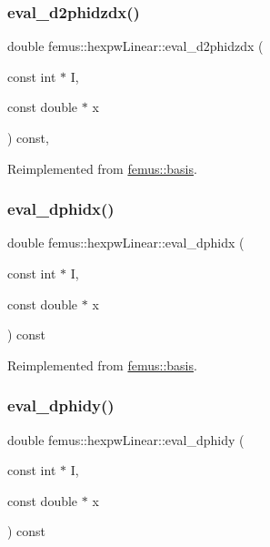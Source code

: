 \subsubsection{\texorpdfstring{eval\+\_\+d2phidzdx()}{eval\_d2phidzdx()}}
{\footnotesize\ttfamily double femus\+::hexpw\+Linear\+::eval\+\_\+d2phidzdx (\begin{DoxyParamCaption}\item[{const int $\ast$}]{I,  }\item[{const double $\ast$}]{x }\end{DoxyParamCaption}) const\hspace{0.3cm}{\ttfamily [inline]}, {\ttfamily [virtual]}}



Reimplemented from \mbox{\hyperlink{classfemus_1_1basis_a5d619ec5bd57b7d2dc34a99d69975c77}{femus\+::basis}}.

\mbox{\label{classfemus_1_1hexpw_linear_a954c0487a8e7fb613697353f7e463024}} 
\subsubsection{\texorpdfstring{eval\+\_\+dphidx()}{eval\_dphidx()}}
{\footnotesize\ttfamily double femus\+::hexpw\+Linear\+::eval\+\_\+dphidx (\begin{DoxyParamCaption}\item[{const int $\ast$}]{I,  }\item[{const double $\ast$}]{x }\end{DoxyParamCaption}) const\hspace{0.3cm}{\ttfamily [virtual]}}



Reimplemented from \mbox{\hyperlink{classfemus_1_1basis_a4db7d29cf8a753ddbccc4a297dafa0bf}{femus\+::basis}}.

\mbox{\label{classfemus_1_1hexpw_linear_a6ebee6c469d4a59ad8fa29b797a9bd23}} 
\subsubsection{\texorpdfstring{eval\+\_\+dphidy()}{eval\_dphidy()}}
{\footnotesize\ttfamily double femus\+::hexpw\+Linear\+::eval\+\_\+dphidy (\begin{DoxyParamCaption}\item[{const int $\ast$}]{I,  }\item[{const double $\ast$}]{x }\end{DoxyParamCaption}) const\hspace{0.3cm}{\ttfamily [virtual]}}



